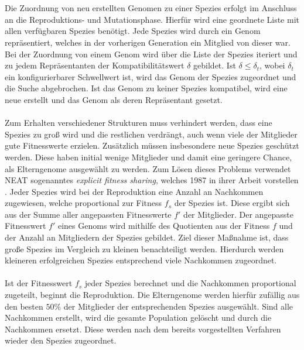 \\\\
Die Zuordnung von neu erstellten Genomen zu einer Spezies erfolgt im Anschluss an die Reproduktions- und Mutationsphase. Hierfür wird eine geordnete Liste mit allen verfügbaren Spezies benötigt. Jede Spezies wird durch ein Genom repräsentiert, welches in der vorherigen Generation ein Mitglied von dieser war. Bei der Zuordnung von einem Genom wird über die Liste der Spezies iteriert und zu jedem Repräsentanten der Kompatibilitätswert $\delta$ gebildet. Ist $\delta \leq \delta_t$, wobei $\delta_t$ ein konfigurierbarer Schwellwert ist, wird das Genom der Spezies zugeordnet und die Suche abgebrochen. Ist das Genom zu keiner Spezies kompatibel, wird eine neue erstellt und das Genom als deren Repräsentant gesetzt.
\\\\
Zum Erhalten verschiedener Strukturen muss verhindert werden, dass eine Spezies zu groß wird und die restlichen verdrängt, auch wenn viele der Mitglieder gute Fitnesswerte erzielen. Zusätzlich müssen insbesondere neue Spezies geschützt werden. Diese haben initial wenige Mitglieder und damit eine geringere Chance, als Elterngenome ausgewählt zu werden. Zum Lösen dieses Problems verwendet \ac{NEAT} sogenanntes \emph{explicit fitness sharing}, welches \citeauthor{goldberg1987genetic} 1987 in ihrer Arbeit vorstellen \cite{goldberg1987genetic}. Jeder Spezies wird bei der Reproduktion eine Anzahl an Nachkommen zugewiesen, welche proportional zur Fitness $f_{s}$ der Spezies ist. Diese ergibt sich aus der Summe aller angepassten Fitnesswerte $f'$ der Mitglieder. Der angepasste Fitnesswert $f'$ eines Genoms wird mithilfe des Quotienten aus der Fitness $f$ und der Anzahl an Mitgliedern der Spezies gebildet. Ziel dieser Maßnahme ist, dass große Spezies im Vergleich zu kleinen benachteiligt werden. Hierdurch werden kleineren erfolgreichen Spezies entsprechend viele Nachkommen zugeordnet.
\\\\
Ist der Fitnesswert $f_s$ jeder Spezies berechnet und die Nachkommen proportional zugeteilt, beginnt die Reproduktion. Die Elterngenome werden hierfür zufällig aus den besten $50\%$ der Mitglieder der entsprechenden Spezies ausgewählt. Sind alle Nachkommen erstellt, wird die gesamte Population gelöscht und durch die Nachkommen ersetzt. Diese werden nach dem bereits vorgestellten Verfahren wieder den Spezies zugeordnet.

